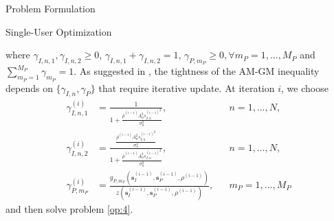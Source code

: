 \documentclass{IEEEtran}
\begin{document}
\begin{section}{Problem Formulation}
\begin{subsection}{Single-User Optimization}
\begin{mini}
		\end{mini}
		where $\gamma_{I,n,1},\gamma_{I,n,2} \ge 0$, $\gamma_{I,n,1}+\gamma_{I,n,2}=1$, $\gamma_{P,m_P} \ge 0,\forall m_P=1,\dots,M_P$ and $\sum_{{m_P}=1}^{M_P}{\gamma_{m_P}}=1$. As suggested in \cite{Clerckx2018b}, the tightness of the AM-GM inequality depends on $\{\gamma_{I,n},\gamma_P\}$ that require iterative update. At iteration $i$, we choose
		\begin{align}
			\gamma_{I,n,1}^{(i)} & =\frac{1}{1+\frac{\bar{\rho}^{(i-1)}{A_n^2}{s_{I,n}^{(i-1)}}^2}{\sigma_n^2}},                                                                         &  & n=1,\dots,N,    \\
			\gamma_{I,n,2}^{(i)} & =\frac{\frac{\bar{\rho}^{(i-1)}{A_n^2}{s_{I,n}^{(i-1)}}^2}{\sigma_n^2}}{1+\frac{\bar{\rho}^{(i-1)}{A_n^2}{s_{I,n}^{(i-1)}}^2}{\sigma_n^2}},           &  & n=1,\dots,N,    \\
			\gamma_{P,m_P}^{(i)} & =\frac{g_{P,m_P}(\boldsymbol{s}_I^{(i-1)},\boldsymbol{s}_P^{(i-1)},\rho^{(i-1)})}{z(\boldsymbol{s}_I^{(i-1)},\boldsymbol{s}_P^{(i-1)},\rho^{(i-1)})}, &  & m_P=1,\dots,M_P
		\end{align}
		and then solve problem \ref{op:4}.
	\end{subsection}
\end{section}



\end{document}

